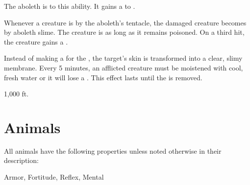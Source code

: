       
        The aboleth is  to this ability.
        It gains a   to .
      
        Whenever a creature is  by the aboleth's tentacle,
          the damaged creature becomes  by aboleth slime.
        The creature is  as long as it remains poisoned.
        On a third hit, the creature gains a .

        Instead of making a  for the ,
          the target's skin is transformed into a clear, slimy membrane.
        Every 5 minutes, an afflicted creature must be moistened with cool, fresh water
          or it will lose a .
        This effect lasts until the  is removed.
      
     1,000 ft.
  
        \newpage
        \section{Animals}

        All animals have the following properties unless noted otherwise in their description:
        
    
     Armor,
     Fortitude,
     Reflex,
     Mental
  
  
      
